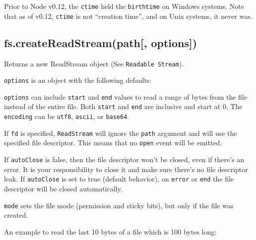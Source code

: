 Prior to Node v0.12, the \texttt{ctime} held the \texttt{birthtime} on
Windows systems. Note that as of v0.12, \texttt{ctime} is not ``creation
time'', and on Unix systems, it never was.

\subsection{fs.createReadStream(path{[},
options{]})}\label{fs.createreadstreampath-options}

Returns a new ReadStream object (See \texttt{Readable\ Stream}).

\texttt{options} is an object with the following defaults:

\begin{Shaded}
\begin{Highlighting}[]
\NormalTok{\{ }\NormalTok{: }\NormalTok{,}
  \NormalTok{: }\NormalTok{,}
  \NormalTok{: }\NormalTok{,}
  \NormalTok{: }\NormalTok{,}
  \NormalTok{: }
\NormalTok{\}}
\end{Highlighting}
\end{Shaded}

\texttt{options} can include \texttt{start} and \texttt{end} values to
read a range of bytes from the file instead of the entire file. Both
\texttt{start} and \texttt{end} are inclusive and start at 0. The
\texttt{encoding} can be
\texttt{\textquotesingle{}utf8\textquotesingle{}},
\texttt{\textquotesingle{}ascii\textquotesingle{}}, or
\texttt{\textquotesingle{}base64\textquotesingle{}}.

If \texttt{fd} is specified, \texttt{ReadStream} will ignore the
\texttt{path} argument and will use the specified file descriptor. This
means that no \texttt{open} event will be emitted.

If \texttt{autoClose} is false, then the file descriptor won't be
closed, even if there's an error. It is your responsibility to close it
and make sure there's no file descriptor leak. If \texttt{autoClose} is
set to true (default behavior), on \texttt{error} or \texttt{end} the
file descriptor will be closed automatically.

\texttt{mode} sets the file mode (permission and sticky bits), but only
if the file was created.

An example to read the last 10 bytes of a file which is 100 bytes long:

